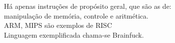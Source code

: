 \documentclass[preview]{standalone}
\begin{document}
Há apenas instruções de propósito geral, que são as de: \\ manipulação de memória, controle e aritmética.\\ARM, MIPS são exemplos de RISC\\Linguagem exemplificada chama-se Brainfuck.\\
\end{document}
